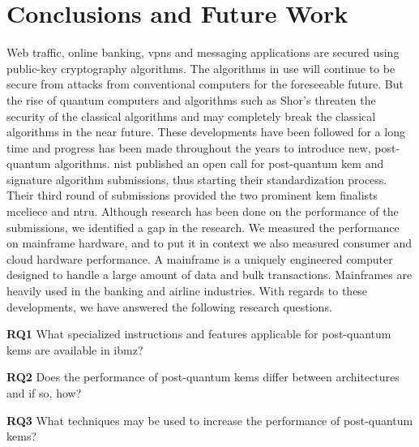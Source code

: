 \chapter{Conclusions and Future Work}
\label{chapter:conclusion}

\noindent Web traffic, online banking, \glspl{vpn} and messaging applications are secured using public-key cryptography algorithms. The algorithms in use will continue to be secure from attacks from conventional computers for the foreseeable future.  But the rise of quantum computers and algorithms such as Shor's threaten the security of the classical algorithms and may completely break the classical algorithms in the near future. These developments have been followed for a long time and progress has been made throughout the years to introduce new, \gls{post-quantum} algorithms. \acrfull{nist} published an open call for \gls{post-quantum} \gls{kem} and signature algorithm submissions, thus starting their standardization process. Their third round of submissions provided the two prominent \gls{kem} finalists \gls{mceliece} and \gls{ntru}. Although research has been done on the performance of the submissions, we identified a gap in the research. We measured the performance on mainframe hardware, and to put it in context we also measured consumer and cloud hardware performance. A mainframe is a uniquely engineered computer designed to handle a large amount of data and bulk transactions. Mainframes are heavily used in the banking and airline industries. With regards to these developments, we have answered the following research questions.

\begin{description}
    \item \textbf{RQ1} What specialized instructions and features applicable for \gls{post-quantum} \acrlong{kem}s are available in \gls{ibmz}?
    
    \item \textbf{RQ2} Does the performance of \gls{post-quantum} \acrlong{kem}s differ between architectures and if so, how?
    
    \item \textbf{RQ3} What techniques may be used to increase the performance of \gls{post-quantum} \acrlong{kem}s?
\end{description}


